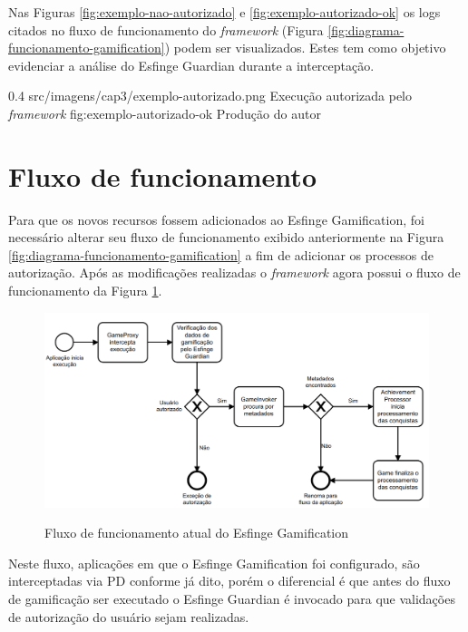 \par Nas Figuras \ref{fig:exemplo-nao-autorizado} e \ref{fig:exemplo-autorizado-ok} os logs citados no fluxo de funcionamento do \textit{framework} (Figura  \ref{fig:diagrama-funcionamento-gamification}) podem ser visualizados. Estes tem como objetivo evidenciar a análise do Esfinge Guardian durante a interceptação.

\begin{image}
{0.4}
{src/imagens/cap3/exemplo-autorizado.png}
{Execução autorizada pelo \textit{framework}}
{fig:exemplo-autorizado-ok}
{Produção do autor}
\end{image}

\section{Fluxo de funcionamento}

\par Para que os novos recursos fossem adicionados ao Esfinge Gamification, foi necessário alterar seu fluxo de funcionamento exibido anteriormente na Figura \ref{fig:diagrama-funcionamento-gamification} a fim de adicionar os processos de autorização. Após as modificações realizadas o \textit{framework} agora possui o fluxo de funcionamento da Figura \ref{fig:fluxo-atual}.

\begin{figure}[H]
    \centering
    \caption{Fluxo de funcionamento atual do Esfinge Gamification}
    \includegraphics[scale=0.3]{src/imagens/cap3/fluxo-atual.png}
    \label{fig:fluxo-atual}
\end{figure}

\par Neste fluxo, aplicações em que o Esfinge Gamification foi configurado, são interceptadas via PD conforme já dito, porém o diferencial é que antes do fluxo de gamificação ser executado o Esfinge Guardian é invocado para que validações de autorização do usuário sejam realizadas. 

